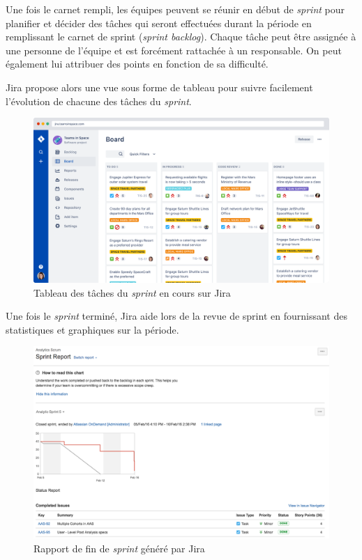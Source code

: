 Une fois le carnet rempli, les équipes peuvent se réunir en début de \textit{sprint} pour planifier et décider des tâches qui seront effectuées durant la période en remplissant le carnet de sprint (\textit{sprint backlog}). Chaque tâche peut être assignée à une personne de l'équipe et est forcément rattachée à un responsable. On peut également lui attribuer des points en fonction de sa difficulté.

Jira propose alors une vue sous forme de tableau pour suivre facilement l'évolution de chacune des tâches du \textit{sprint}.

  \begin{figure}[H]
    \centering
    \includegraphics[width=1\linewidth]{img/jira_board.png}
    \caption{Tableau des tâches du \textit{sprint} en cours sur Jira}
  \end{figure}
  
Une fois le \textit{sprint} terminé, Jira aide lors de la revue de sprint en fournissant des statistiques et graphiques sur la période.

  \begin{figure}[H]
    \centering
    \includegraphics[width=1\linewidth]{img/jira-sprint-report.png}
    \caption{Rapport de fin de \textit{sprint} généré par Jira}
  \end{figure}
  
